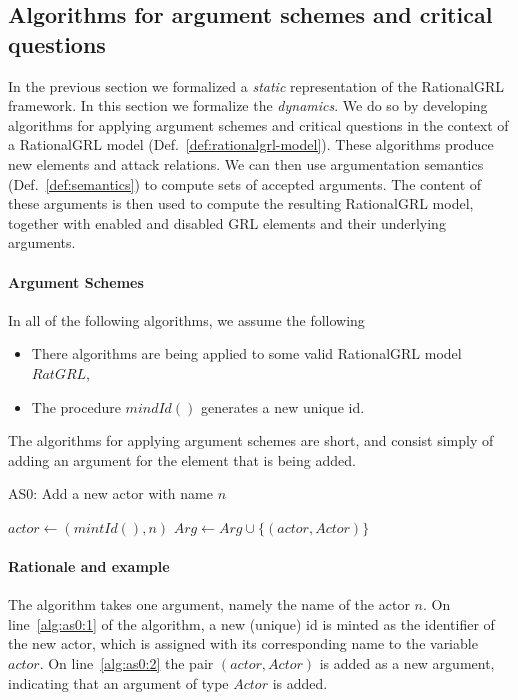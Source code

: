 \subsection{Algorithms for argument schemes and critical questions}
\label{sect:algorithms}

In the previous section we formalized a \emph{static} representation of the RationalGRL framework. In this section we formalize the \emph{dynamics}. We do so by developing algorithms for applying argument schemes and critical questions in the context of a RationalGRL model (Def.~\ref{def:rationalgrl-model}). These algorithms produce new elements and attack relations. We can then use argumentation semantics (Def.~\ref{def:semantics}) to compute sets of accepted arguments. The content of these arguments is then used to compute the resulting RationalGRL model, together with enabled and disabled GRL elements and their underlying arguments.

\paragraph{Argument Schemes}

In all of the following algorithms, we assume the following
\begin{itemize}
\item There algorithms are being applied to some valid RationalGRL model $RatGRL$,
\item The procedure $mindId()$ generates a new unique id.
\end{itemize}

The algorithms for applying argument schemes are short, and consist simply of adding an argument for the element that is being added.

\begin{algorithm}[h]
  \caption{AS0: Add a new actor with name $n$}\label{alg:as0}
  \begin{algorithmic}[1]
    \State $actor \leftarrow (mintId(), n)$ \label{alg:as0:1}
    \State $Arg\leftarrow Arg \cup \{(actor,Actor)\}$\label{alg:as0:2}
    \EndProcedure
  \end{algorithmic}
\end{algorithm}

\paragraph{Rationale and example} The algorithm takes one argument, namely the name of the actor $n$. On line~\ref{alg:as0:1} of the algorithm, a new (unique) id is minted as the identifier of the new actor, which is assigned with its corresponding name to the variable $actor$. On line~\ref{alg:as0:2} the pair $(actor,Actor)$ is added as a new argument, indicating that an argument of type $Actor$ is added.

